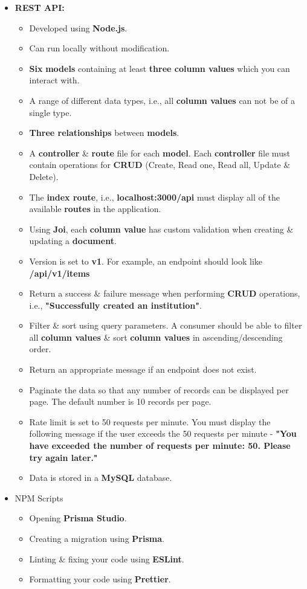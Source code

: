 \documentclass{article}
\begin{document}
\begin{itemize}
	\item \textbf{REST API:}
	\begin{itemize}
	\item Developed using \textbf{Node.js}.
	\item Can run locally without modification.
	\item \textbf{Six} \textbf{models} containing at least \textbf{three column values} which you can interact with.
	\item A range of different data types, i.e., all \textbf{column values} can not be of a single type.
	\item \textbf{Three relationships} between \textbf{models}.
	\item A \textbf{controller} \& \textbf{route} file for each \textbf{model}. Each \textbf{controller} file must contain operations for \textbf{CRUD} (Create, Read one, Read all, Update \& Delete).
	\item The \textbf{index route}, i.e., \textbf{localhost:3000/api} must display all of the available \textbf{routes} in the application.
	\item Using \textbf{Joi}, each \textbf{column value} has custom validation when creating \& updating a \textbf{document}.
	\item Version is set to \textbf{v1}. For example, an endpoint should look like \textbf{/api/v1/items}
	\item Return a success \& failure message when performing \textbf{CRUD} operations, i.e., \textbf{"Successfully created an institution"}.
	\item Filter \& sort using query parameters. A consumer should be able to filter all \textbf{column values} \& sort \textbf{column values} in ascending/descending order.
	\item Return an appropriate message if an endpoint does not exist.
	\item Paginate the data so that any number of records can be displayed per page. The default number is 10 records per page. 
	\item Rate limit is set to 50 requests per minute. You must display the following message if the user exceeds the 50 requests per minute - \textbf{"You have exceeded the number of requests per minute: 50. Please try again later."}
	\item Data is stored in a \textbf{MySQL} database.
\end{itemize}
\item NPM Scripts
\begin{itemize}
	\item Opening \textbf{Prisma Studio}.
	\item Creating a migration using \textbf{Prisma}. 
	\item Linting \& fixing your code using \textbf{ESLint}.
	\item Formatting your code using \textbf{Prettier}.
\end{itemize}
\end{itemize}
\end{document}
